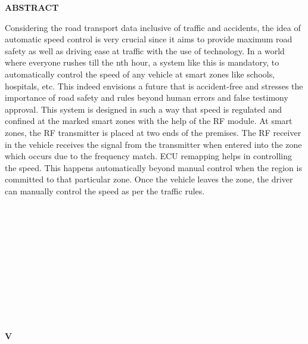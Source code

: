\documentclass[a4paper,12pt, English]{article}
\begin{document}
\begin{titlepage}

\begin{center}
    \textbf{\Large ABSTRACT}\\
\end{center}

\begin{normalsize}
Considering the road transport data inclusive of traffic and accidents, the idea of automatic
speed control is very crucial since it aims to provide maximum road safety as well as driving
ease at traffic with the use of technology. In a world where everyone rushes till the nth hour, a
system like this is mandatory, to automatically control the speed of any vehicle at smart zones
like schools, hospitals, etc. This indeed envisions a future that is accident-free and stresses the
importance of road safety and rules beyond human errors and false testimony approval. This
system is designed in such a way that speed is regulated and confined at the marked smart zones
with the help of the RF module. At smart zones, the RF transmitter is placed at two ends of the
premises. The RF receiver in the vehicle receives the signal from the transmitter when entered
into the zone which occurs due to the frequency match. ECU remapping helps in controlling
the speed. This happens automatically beyond manual control when the region is committed to
that particular zone. Once the vehicle leaves the zone, the driver can manually control the speed
as per the traffic rules.
\newline
\newline
\end{normalsize}\\\\\\\\\\\\\\\\\\\\
\begin{normalsize}
\begin{center}
\textbf{V}
\end{center}
\end{normalsize}
\end{titlepage}
\end{document}
